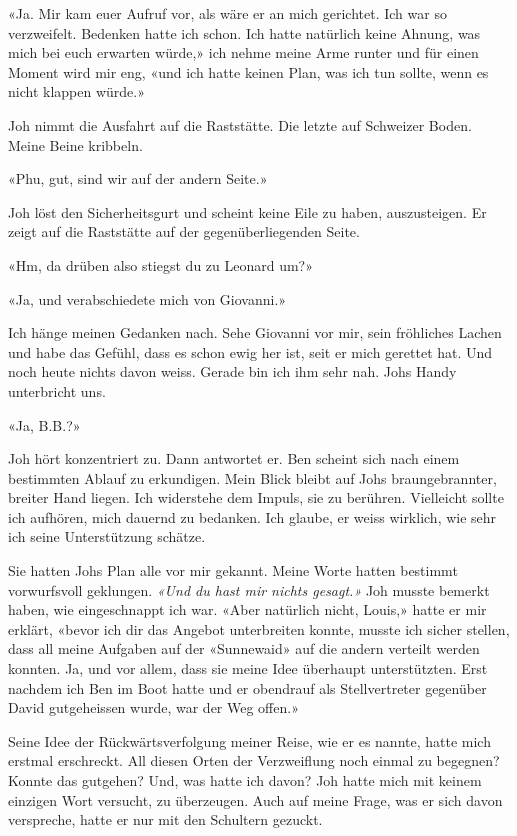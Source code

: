«Ja. Mir kam euer Aufruf vor, als wäre er an mich gerichtet. Ich war so
verzweifelt. Bedenken hatte ich schon. Ich hatte natürlich keine Ahnung,
was mich bei euch erwarten würde,» ich nehme meine Arme runter und für
einen Moment wird mir eng, «und ich hatte keinen Plan, was ich tun sollte,
wenn es nicht klappen würde.»

Joh nimmt die Ausfahrt auf die Raststätte. Die letzte auf Schweizer
Boden.
Meine Beine kribbeln.

«Phu, gut, sind wir auf der andern Seite.»

Joh löst den Sicherheitsgurt und scheint keine Eile zu haben,
auszusteigen.
Er zeigt auf die Raststätte auf der gegenüberliegenden Seite.

«Hm, da drüben also stiegst du zu Leonard um?»

«Ja, und verabschiedete mich von Giovanni.»

Ich hänge meinen Gedanken nach. Sehe Giovanni vor mir, sein fröhliches
Lachen und habe das Gefühl, dass es schon ewig her ist, seit er mich
gerettet hat. Und noch heute nichts davon weiss. Gerade bin ich ihm sehr
nah.
Johs Handy unterbricht uns.

«Ja, B.B.?»

Joh hört konzentriert zu. Dann antwortet er. Ben scheint sich nach einem
bestimmten Ablauf zu erkundigen.
Mein Blick bleibt auf Johs braungebrannter, breiter Hand liegen. Ich
widerstehe dem Impuls, sie zu berühren. Vielleicht sollte ich aufhören,
mich dauernd zu bedanken. Ich glaube, er weiss wirklich, wie sehr ich
seine Unterstützung schätze.

Sie hatten Johs Plan alle vor mir gekannt.
Meine Worte hatten bestimmt vorwurfsvoll geklungen. \emph{«Und du hast mir
nichts gesagt.»}
Joh musste bemerkt haben, wie eingeschnappt ich war. «Aber natürlich
nicht, Louis,» hatte er mir erklärt, «bevor ich dir das Angebot
unterbreiten konnte, musste ich sicher stellen, dass all meine Aufgaben
auf der «Sunnewaid» auf die andern verteilt werden konnten. Ja, und vor
allem, dass sie meine Idee überhaupt unterstützten. Erst nachdem ich Ben
im Boot hatte und er obendrauf als Stellvertreter gegenüber David
gutgeheissen wurde, war der Weg offen.»

Seine Idee der Rückwärtsverfolgung meiner Reise, wie er es nannte, hatte
mich erstmal erschreckt. All diesen Orten der Verzweiflung noch einmal
zu begegnen? Konnte das gutgehen? Und, was hatte ich davon? Joh hatte
mich mit keinem einzigen Wort versucht, zu überzeugen. Auch auf meine
Frage, was er sich davon verspreche, hatte er nur mit den Schultern
gezuckt.

